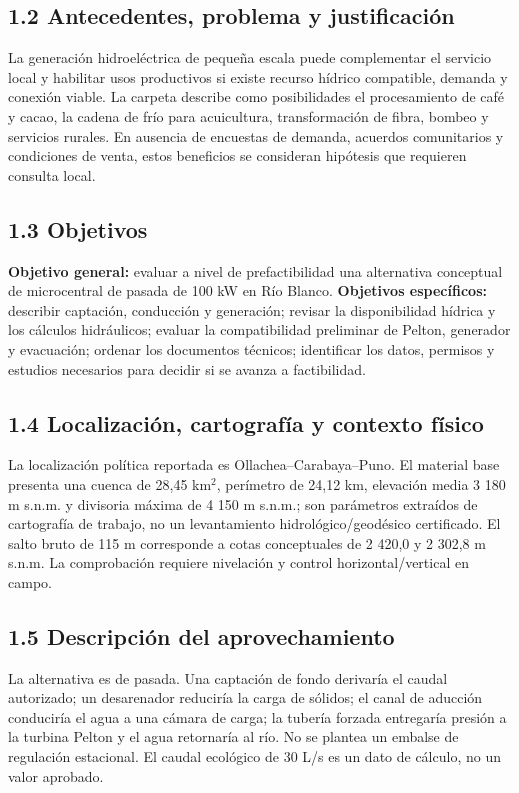 \documentclass[11pt,a4paper]{article}
\begin{document}
\subsection*{1.2 Antecedentes, problema y justificación}
La generación hidroeléctrica de pequeña escala puede complementar el servicio local y habilitar usos productivos si existe recurso hídrico compatible, demanda y conexión viable. La carpeta describe como posibilidades el procesamiento de café y cacao, la cadena de frío para acuicultura, transformación de fibra, bombeo y servicios rurales. En ausencia de encuestas de demanda, acuerdos comunitarios y condiciones de venta, estos beneficios se consideran hipótesis que requieren consulta local.

\subsection*{1.3 Objetivos}
\textbf{Objetivo general:} evaluar a nivel de prefactibilidad una alternativa conceptual de microcentral de pasada de 100 kW en Río Blanco. \textbf{Objetivos específicos:} describir captación, conducción y generación; revisar la disponibilidad hídrica y los cálculos hidráulicos; evaluar la compatibilidad preliminar de Pelton, generador y evacuación; ordenar los documentos técnicos; identificar los datos, permisos y estudios necesarios para decidir si se avanza a factibilidad.

\subsection*{1.4 Localización, cartografía y contexto físico}
La localización política reportada es Ollachea--Carabaya--Puno. El material base presenta una cuenca de 28,45 km$^2$, perímetro de 24,12 km, elevación media 3 180 m s.n.m. y divisoria máxima de 4 150 m s.n.m.; son parámetros extraídos de cartografía de trabajo, no un levantamiento hidrológico/geodésico certificado. El salto bruto de 115 m corresponde a cotas conceptuales de 2 420,0 y 2 302,8 m s.n.m. La comprobación requiere nivelación y control horizontal/vertical en campo.

\subsection*{1.5 Descripción del aprovechamiento}
La alternativa es de pasada. Una captación de fondo derivaría el caudal autorizado; un desarenador reduciría la carga de sólidos; el canal de aducción conduciría el agua a una cámara de carga; la tubería forzada entregaría presión a la turbina Pelton y el agua retornaría al río. No se plantea un embalse de regulación estacional. El caudal ecológico de 30 L/s es un dato de cálculo, no un valor aprobado.
\end{document}
